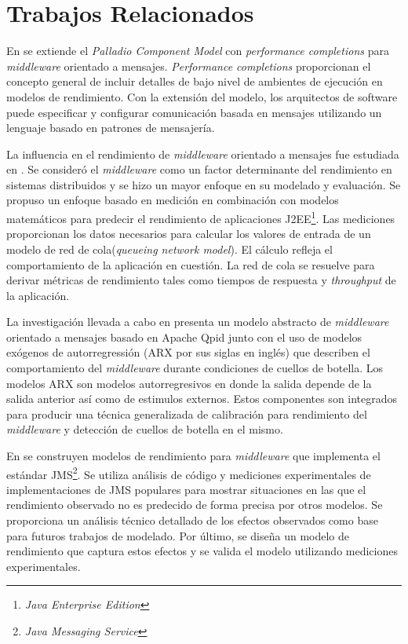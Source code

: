 \documentclass[conference]{IEEEtran}
\begin{document}
\section{Trabajos Relacionados} \label{sec:trabajos-relacionados}
En \cite{happe-et-al} se extiende el \emph{Palladio Component Model} con \emph{performance completions} para \emph{middleware} orientado a mensajes. \emph{Performance completions}\cite{woodside-et-al-2} proporcionan el concepto general de incluir detalles de bajo nivel de ambientes de ejecución en modelos de rendimiento. Con la extensión del modelo, los arquitectos de software puede especificar y configurar comunicación basada en mensajes utilizando un lenguaje basado en patrones de mensajería.

La influencia en el rendimiento de \emph{middleware} orientado a mensajes fue estudiada en \cite{liu-gordon}. Se consideró el \emph{middleware} como un factor determinante del rendimiento en sistemas distribuidos y se hizo un mayor enfoque en su modelado y evaluación. Se propuso un enfoque basado en medición en combinación con modelos matemáticos para predecir el rendimiento de aplicaciones J2EE\footnote{\emph{Java Enterprise Edition}}. Las mediciones proporcionan los datos necesarios para calcular los valores de entrada de un modelo de red de cola(\emph{queueing network model}). El cálculo refleja el comportamiento de la aplicación en cuestión. La red de cola se resuelve para derivar métricas de rendimiento tales como tiempos de respuesta y \emph{throughput} de la aplicación. 

La investigación llevada a cabo en \cite{chew} presenta un modelo abstracto de \emph{middleware} orientado a mensajes basado en Apache Qpid junto con el uso de modelos exógenos de autorregressión (ARX por sus siglas en inglés) que describen el comportamiento del \emph{middleware} durante condiciones de cuellos de botella. Los modelos ARX son modelos autorregresivos en donde la salida depende de la salida anterior así como de estimulos externos. Estos componentes son integrados para producir una técnica generalizada de calibración para rendimiento del \emph{middleware} y detección de cuellos de botella en el mismo.

En \cite{martinec-et-al} se construyen modelos de rendimiento para \emph{middleware} que implementa el estándar JMS\footnote{\emph{Java Messaging Service}}. Se utiliza análisis de código y mediciones experimentales de implementaciones de JMS populares para mostrar situaciones en las que el rendimiento observado no es predecido de forma precisa por otros modelos. Se proporciona un análisis técnico detallado de los efectos observados como base para futuros trabajos de modelado. Por último, se diseña un modelo de rendimiento que captura estos efectos y se valida el modelo utilizando mediciones experimentales.
\end{document}
